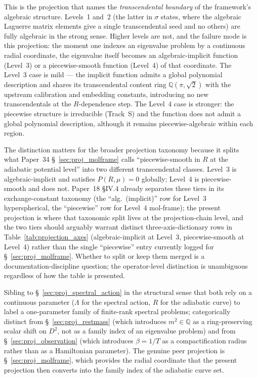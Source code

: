 This is the projection that names the \emph{transcendental boundary}
of the framework's algebraic structure.  Levels~1 and~2 (the latter
in $\sigma$ states, where the algebraic Laguerre matrix elements give
a single transcendental seed and no others) are fully algebraic in
the strong sense.  Higher levels are not, and the failure mode is
this projection: the moment one indexes an eigenvalue problem by a
continuous radial coordinate, the eigenvalue itself becomes an
algebraic-implicit function (Level~3) or a piecewise-smooth function
(Level~4) of that coordinate.  The Level~3 case is mild --- the
implicit function admits a global polynomial description and shares
its transcendental content ring $\mathbb{Q}(\pi, \sqrt{2})$ with the
upstream calibration and embedding constants, introducing no new
transcendentals at the $R$-dependence step.  The Level~4 case is
stronger: the piecewise structure is irreducible (Track~S) and the
function does not admit a global polynomial description, although it
remains piecewise-algebraic within each region.

The distinction matters for the broader projection taxonomy because
it splits what Paper~34 \S~\ref{sec:proj_molframe} calls
``piecewise-smooth in $R$ at the adiabatic potential level'' into two
different transcendental classes.  Level~3 is algebraic-implicit and
satisfies $P(R, \mu) = 0$ globally; Level~4 is piecewise-smooth and
does not.  Paper~18 §IV.4 already separates these tiers in its
exchange-constant taxonomy (the ``alg.\ (implicit)'' row for Level~3
hyperspherical, the ``piecewise'' row for Level~4 mol-frame); the
present projection is where that taxonomic split lives at the
projection-chain level, and the two tiers should arguably warrant
distinct three-axis-dictionary rows in
Table~\ref{tab:projection_axes} (algebraic-implicit at Level~3,
piecewise-smooth at Level~4) rather than the single ``piecewise''
entry currently logged for \S~\ref{sec:proj_molframe}.  Whether to
split or keep them merged is a documentation-discipline question; the
operator-level distinction is unambiguous regardless of how the table
is presented.

Sibling to \S~\ref{sec:proj_spectral_action} in the structural sense
that both rely on a continuous parameter ($\Lambda$ for the spectral
action, $R$ for the adiabatic curve) to label a one-parameter family
of finite-rank spectral problems; categorically distinct from
\S~\ref{sec:proj_restmass} (which introduces $m^2 \in \mathbb{Q}$ as a
ring-preserving scalar shift on $D^2$, not as a family index of an
eigenvalue problem) and from \S~\ref{sec:proj_observation} (which
introduces $\beta = 1/T$ as a compactification radius rather than as
a Hamiltonian parameter).  The genuine peer projection is
\S~\ref{sec:proj_molframe}, which provides the radial coordinate that
the present projection then converts into the family index of the
adiabatic curve set.

